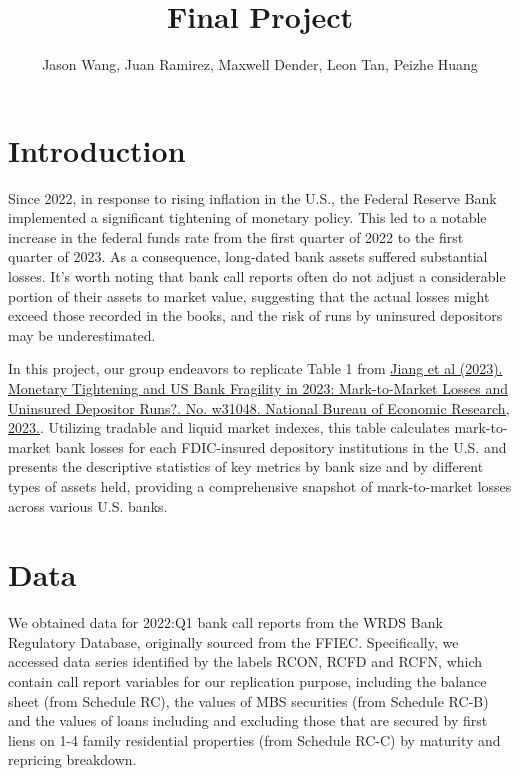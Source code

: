 \documentclass{article}
\title{Final Project}
\author{Jason Wang, Juan Ramirez, Maxwell Dender, Leon Tan, Peizhe Huang}
\begin{document}
\maketitle


\section{Introduction}


Since 2022, in response to rising inflation in the U.S., the Federal Reserve Bank implemented a significant tightening of monetary policy. This led to a notable increase in the federal funds rate from the first quarter of 2022 to the first quarter of 2023. As a consequence, long-dated bank assets suffered substantial losses. It's worth noting that bank call reports often do not adjust a considerable portion of their assets to market value, suggesting that the actual losses might exceed those recorded in the books,  and the risk of runs by uninsured depositors may be underestimated.

In this project, our group endeavors to replicate Table 1 from \href{https://www.nber.org/papers/w31048}{Jiang et al (2023). Monetary Tightening and US Bank Fragility in 2023: Mark-to-Market Losses and Uninsured Depositor Runs?. No. w31048. National Bureau of Economic Research, 2023.}. Utilizing tradable and liquid market indexes, this table calculates mark-to-market bank losses for each FDIC-insured depository institutions in the U.S. and presents the descriptive statistics of key metrics by bank size and by different types of assets held, providing a comprehensive snapshot of mark-to-market losses across various U.S. banks.
 

\section{Data}

We obtained data for 2022:Q1 bank call reports from the WRDS Bank Regulatory Database, originally sourced from the FFIEC. Specifically, we accessed data series identified by the labels RCON, RCFD and RCFN, which contain call report variables for our replication purpose, including the balance sheet (from Schedule RC), the values of MBS securities (from Schedule RC-B) and the values of loans including and excluding those that are secured by first liens on 1-4 family residential properties (from Schedule RC-C) by maturity and repricing breakdown.
\end{document}
